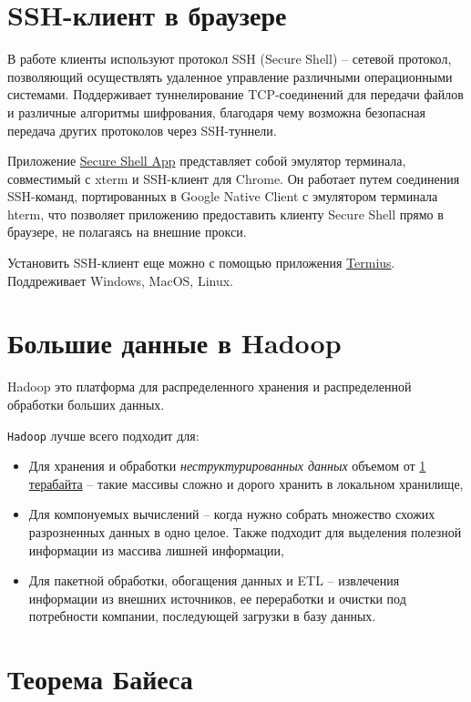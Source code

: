 \documentclass[%
	11pt,
	a4paper,
	utf8,
		]{article}
\begin{document}
\section{SSH-клиент в браузере}

В работе клиенты используют протокол SSH (Secure Shell) -- сетевой протокол, позволяющий осуществлять удаленное управление различными операционными системами. Поддерживает туннелирование TCP-соединений для передачи файлов и различные алгоритмы шифрования, благодаря чему возможна безопасная передача других протоколов через SSH-туннели.

Приложение \href{https://chrome.google.com/webstore/detail/secure-shell-app/pnhechapfaindjhompbnflcldabbghjo?hl=ru}{\ttfamily Secure Shell App} представляет собой эмулятор терминала, совместимый с xterm и SSH-клиент для Chrome. Он работает путем соединения SSH-команд, портированных в Google Native Client с эмулятором терминала hterm, что позволяет приложению предоставить клиенту Secure Shell прямо в браузере, не полагаясь на внешние прокси.

Установить SSH-клиент еще можно с помощью приложения \href{https://www.termius.com/}{Termius}. Поддреживает Windows, MacOS, Linux.


\section{Большие данные в Hadoop}

Hadoop это платформа для распределенного хранения и распределенной обработки больших данных.

\texttt{Hadoop} лучше всего подходит для:
\begin{itemize}
	\item Для хранения и обработки \emph{неструктурированных данных} объемом от \underline{1 терабайта} -- такие массивы сложно и дорого хранить в локальном хранилище,
	
	\item Для компонуемых вычислений -- когда нужно собрать множество схожих разрозненных данных в одно целое. Также подходит для выделения полезной информации из массива лишней информации,
	
	\item Для пакетной обработки, обогащения данных и ETL -- извлечения информации из внешних источников, ее переработки и очистки под потребности компании, последующей загрузки в базу данных.
\end{itemize}

\section{Теорема Байеса}
\end{document}
